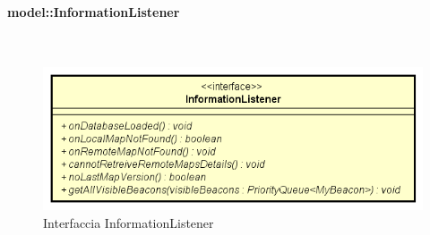 \documentclass[../DefinizioneDiProdotto.tex]{subfiles}
\begin{document}
\paragraph{model::InformationListener}
\
\begin{figure}[H]
	\centering
	\includegraphics[width=\maxwidth]{img/InformationListener.png}
	\caption{Interfaccia InformationListener}\label{fig:model::InformationListener} 
\end{figure}
\end{document}
